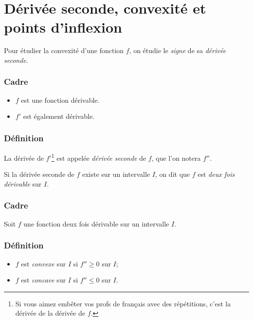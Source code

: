 \documentclass[main.tex]{subfiles}
\begin{document}
\section{Dérivée seconde, convexité et points d'inflexion}

Pour étudier la convexité d'une fonction $f$, on étudie le \emph{signe} de sa \emph{dérivée seconde}.

\begin{definition}
    
    \subsubsection{Cadre}

    \begin{itemize}
        \item $f$ est une fonction dérivable.
        \item $f'$ est également dérivable.
    \end{itemize}

    \subsubsection{Définition}

    La dérivée de $f'$\footnote{%
        Si vous aimez embêter vos profs de français avec des répétitions,
        c'est la dérivée de la dérivée de $f$.
    } est appelée \emph{dérivée seconde} de $f$,
    que l'on notera $f''$.
\end{definition}

Si la dérivée seconde de $f$ existe sur un intervalle $I$,
on dit que $f$ est \emph{deux fois dérivable} sur $I$.

\begin{definition}

    \subsubsection{Cadre}
    Soit $f$ une fonction deux fois dérivable sur un intervalle $I$.

    \subsubsection{Définition}
    \begin{itemize}
        \item $f$ est \emph{convexe} sur $I$ si $f'' \ge 0$ sur $I$;
        \item $f$ est \emph{concave} sur $I$ si $f'' \le 0$ sur $I$.
    \end{itemize}
\end{definition}
\end{document}
